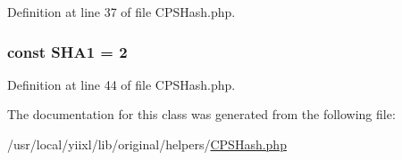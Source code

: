 Definition at line 37 of file CPSHash.php.

\hypertarget{classCPSHash_a1ca7a04dcc397e382e3a4ee5e0e1b9a1}{
\subsubsection[{SHA1}]{\setlength{\rightskip}{0pt plus 5cm}const {\bf SHA1} = 2}}
\label{classCPSHash_a1ca7a04dcc397e382e3a4ee5e0e1b9a1}


Definition at line 44 of file CPSHash.php.



The documentation for this class was generated from the following file:\begin{DoxyCompactItemize}
\item 
/usr/local/yiixl/lib/original/helpers/\hyperlink{CPSHash_8php}{CPSHash.php}\end{DoxyCompactItemize}
